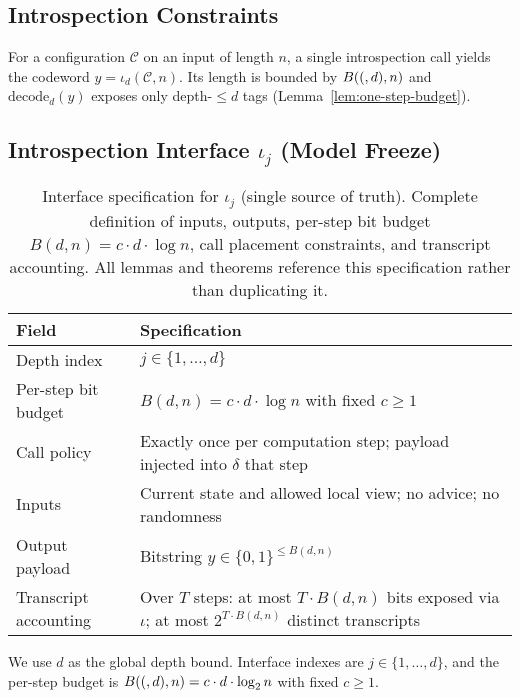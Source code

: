   \subsection{Introspection Constraints}
  
  \begin{definition}
  For a configuration $\mathcal{C}$ on an input of length $n$, a single introspection call yields the codeword $y=\iota_d(\mathcal{C},n)$. Its length is bounded by $B((,d),n)$ and $\mathrm{decode}_d(y)$ exposes only depth-$\le d$ tags (Lemma~\ref{lem:one-step-budget}).
  \end{definition}
  
\subsection{Introspection Interface \texorpdfstring{$\iota_j$}{iota-j} (Model Freeze)}
\label{sec:model-freeze}
  
  \begin{table}[t]
  \centering
\caption{Interface specification for $\iota_j$ (single source of truth). Complete definition of inputs, outputs, per-step bit budget $B(d,n) = c \cdot d \cdot \log n$, call placement constraints, and transcript accounting. All lemmas and theorems reference this specification rather than duplicating it.}
  \label{tab:iota-spec}
  \small  %
  \begin{tabular}{@{}p{3.5cm}p{10cm}@{}}  %
  \toprule
  Field & Specification \\
  \midrule
  Depth index & $j \in \{1,\ldots,d\}$ \\
  Per-step bit budget & $B(d,n) = c \cdot d \cdot \log n$ with fixed $c \ge 1$ \\
  Call policy & Exactly once per computation step; payload injected into $\delta$ that step \\
  Inputs & Current state and allowed local view; no advice; no randomness \\
  Output payload & Bitstring $y \in \{0,1\}^{\le B(d,n)}$ \\
  Transcript accounting & Over $T$ steps: at most $T \cdot B(d,n)$ bits exposed via $\iota$; at most $2^{T \cdot B(d,n)}$ distinct transcripts \\
  \bottomrule
  \end{tabular}
\end{table}
  
  \begin{remark}\label{rem:depth-notation}
We use $d$ as the global depth bound. Interface indexes are $j\in\{1,\dots,d\}$, and the per-step budget is $\B(d,n)=c\cdot d\cdot \log n$ with fixed $c\ge 1$.
  \end{remark}
  
